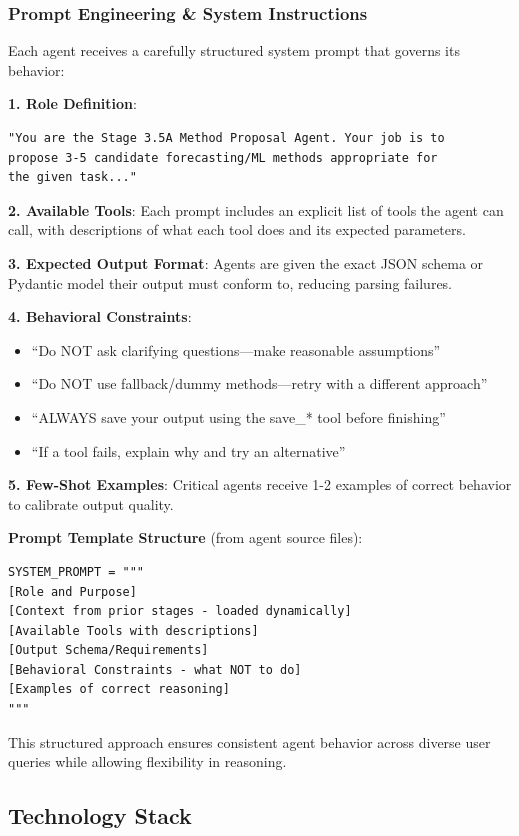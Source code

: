 \documentclass[11pt,a4paper]{article}
\begin{document}
\subsubsection{Prompt Engineering \& System Instructions}

Each agent receives a carefully structured system prompt that governs its behavior:

\textbf{1. Role Definition}:
\begin{verbatim}
"You are the Stage 3.5A Method Proposal Agent. Your job is to 
propose 3-5 candidate forecasting/ML methods appropriate for 
the given task..."
\end{verbatim}

\textbf{2. Available Tools}: Each prompt includes an explicit list of tools the agent can call, with descriptions of what each tool does and its expected parameters.

\textbf{3. Expected Output Format}: Agents are given the exact JSON schema or Pydantic model their output must conform to, reducing parsing failures.

\textbf{4. Behavioral Constraints}:
\begin{itemize}
    \item ``Do NOT ask clarifying questions---make reasonable assumptions''
    \item ``Do NOT use fallback/dummy methods---retry with a different approach''
    \item ``ALWAYS save your output using the save\_* tool before finishing''
    \item ``If a tool fails, explain why and try an alternative''
\end{itemize}

\textbf{5. Few-Shot Examples}: Critical agents receive 1-2 examples of correct behavior to calibrate output quality.

\textbf{Prompt Template Structure} (from agent source files):
\begin{verbatim}
SYSTEM_PROMPT = """
[Role and Purpose]
[Context from prior stages - loaded dynamically]
[Available Tools with descriptions]
[Output Schema/Requirements]
[Behavioral Constraints - what NOT to do]
[Examples of correct reasoning]
"""
\end{verbatim}

This structured approach ensures consistent agent behavior across diverse user queries while allowing flexibility in reasoning.

\subsection{Technology Stack}
\end{document}
